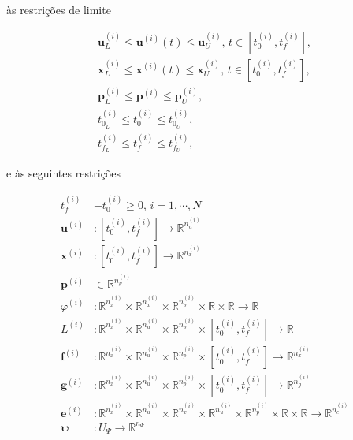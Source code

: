 \noindent às restrições de limite

\begin{gather}
    \mathbf{u}_L^{(i)} \leq \mathbf{u}^{(i)}(t) \leq \mathbf{u}_U^{(i)}, \, t \in \left[ t_0^{(i)}, t_f^{(i)} \right], \nonumber \\
    \mathbf{x}_L^{(i)} \leq \mathbf{x}^{(i)}(t) \leq \mathbf{x}_U^{(i)}, \, t \in \left[ t_0^{(i)}, t_f^{(i)} \right], \nonumber \\
    \mathbf{p}_L^{(i)} \leq \mathbf{p}^{(i)} \leq \mathbf{p}_U^{(i)}, \\
    t_{0_L}^{(i)} \leq t_0^{(i)} \leq t_{0_U}^{(i)}, \nonumber \\
    t_{f_L}^{(i)} \leq t_f^{(i)} \leq t_{f_U}^{(i)}, \nonumber
\end{gather}

\noindent e às seguintes restrições

\begin{equation}
\begin{aligned}
    t_f^{(i)} &- t_0^{(i)} \geq 0, \, i = 1, \cdots, N \\
    \mathbf{u}^{(i)} &: \left[ t_0^{(i)}, t_f^{(i)} \right] \rightarrow \mathbb{R}^{n_u^{(i)}} \\
    \mathbf{x}^{(i)} &: \left[ t_0^{(i)}, t_f^{(i)} \right] \rightarrow \mathbb{R}^{n_x^{(i)}} \\
    \mathbf{p}^{(i)} &\in \mathbb{R}^{n_p^{(i)}} \\
    \varphi^{(i)} &: \mathbb{R}^{n_x^{(i)}} \times \mathbb{R}^{n_x^{(i)}} \times \mathbb{R}^{n_p^{(i)}} \times \mathbb{R} \times \mathbb{R} \rightarrow \mathbb{R} \\
    L^{(i)} &: \mathbb{R}^{n_x^{(i)}} \times \mathbb{R}^{n_u^{(i)}} \times \mathbb{R}^{n_p^{(i)}} \times \left[ t_0^{(i)}, t_f^{(i)} \right] \rightarrow \mathbb{R} \\
    \mathbf{f}^{(i)} &: \mathbb{R}^{n_x^{(i)}} \times \mathbb{R}^{n_u^{(i)}} \times \mathbb{R}^{n_p^{(i)}} \times \left[ t_0^{(i)}, t_f^{(i)} \right] \rightarrow \mathbb{R}^{n_x^{(i)}} \\
    \mathbf{g}^{(i)} &: \mathbb{R}^{n_x^{(i)}} \times \mathbb{R}^{n_u^{(i)}} \times \mathbb{R}^{n_p^{(i)}} \times \left[ t_0^{(i)}, t_f^{(i)} \right] \rightarrow \mathbb{R}^{n_g^{(i)}} \\
    \mathbf{e}^{(i)} &: \mathbb{R}^{n_x^{(i)}} \times \mathbb{R}^{n_u^{(i)}} \times \mathbb{R}^{n_x^{(i)}} \times \mathbb{R}^{n_u^{(i)}} \times \mathbb{R}^{n_p^{(i)}} \times \mathbb{R} \times \mathbb{R} \rightarrow \mathbb{R}^{n_e^{(i)}} \\
    \boldsymbol{\psi} &: U_{\Psi} \rightarrow \mathbb{R}^{n_{\Psi}}
\end{aligned}
\end{equation}

